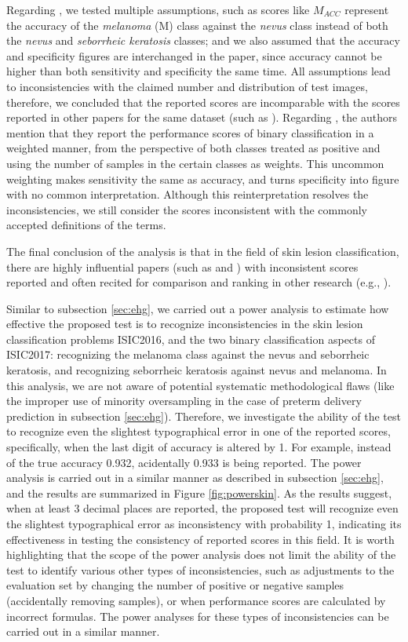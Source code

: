 \documentclass[3p, times]{elsarticle}
\begin{document}
Regarding \cite{skin7}, we tested multiple assumptions, such as scores like $M_{ACC}$ represent the accuracy of the \emph{melanoma} (M) class against the \emph{nevus} class instead of both the \emph{nevus} and \emph{seborrheic keratosis} classes; and we also assumed that the accuracy and specificity figures are interchanged in the paper, since accuracy cannot be higher than both sensitivity and specificity the same time. All assumptions lead to inconsistencies with the claimed number and distribution of test images, therefore, we concluded that the reported scores are incomparable with the scores reported in other papers for the same dataset (such as \cite{skin3}). Regarding \cite{skin9}, the authors mention that they report the performance scores of binary classification in a weighted manner, from the perspective of both classes treated as positive and using the number of samples in the certain classes as weights. This uncommon weighting makes sensitivity the same as accuracy, and turns specificity into figure with no common interpretation. Although this reinterpretation resolves the inconsistencies, we still consider the scores inconsistent with the commonly accepted definitions of the terms.

The final conclusion of the analysis is that in the field of skin lesion classification, there are highly influential papers (such as \cite{skin7} and \cite{skin9}) with inconsistent scores reported and often recited for comparison and ranking in other research (e.g., \cite{skin7ref}).

{
    \color{blue}
    Similar to subsection \ref{sec:ehg}, we carried out a power analysis to estimate how effective the proposed test is to recognize inconsistencies in the skin lesion classification problems ISIC2016, and the two binary classification aspects of ISIC2017: recognizing the melanoma class against the nevus and seborrheic keratosis, and recognizing seborrheic keratosis against nevus and melanoma. In this analysis, we are not aware of potential systematic methodological flaws (like the improper use of minority oversampling in the case of preterm delivery prediction in subsection \ref{sec:ehg}). Therefore, we investigate the ability of the test to recognize even the slightest typographical error in one of the reported scores, specifically, when the last digit of accuracy is altered by 1. For example, instead of the true accuracy 0.932, acidentally 0.933 is being reported. The power analysis is carried out in a similar manner as described in subsection \ref{sec:ehg}, and the results are summarized in Figure \ref{fig:powerskin}. As the results suggest, when at least 3 decimal places are reported, the proposed test will recognize even the slightest typographical error as inconsistency with probability 1, indicating its effectiveness in testing the consistency of reported scores in this field. It is worth highlighting that the scope of the power analysis does not limit the ability of the test to identify various other types of inconsistencies, such as adjustments to the evaluation set by changing the number of positive or negative samples (accidentally removing samples), or when performance scores are calculated by incorrect formulas. The power analyses for these types of inconsistencies can be carried out in a similar manner.
}
\end{document}
